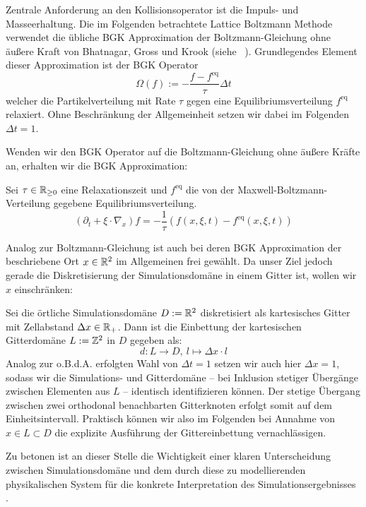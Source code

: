 Zentrale Anforderung an den Kollisionsoperator ist die Impuls- und Masseerhaltung. Die im Folgenden betrachtete Lattice Boltzmann Methode verwendet die übliche BGK Approximation der Boltzmann-Gleichung ohne äußere Kraft von Bhatnagar, Gross und Krook (siehe ~\cite[Kap.~3.5.3]{Krueger17}).
Grundlegendes Element dieser Approximation ist der BGK Operator
\[\Omega(f) := -\frac{f-f^\text{eq}}{\tau} \Delta t\]
welcher die Partikelverteilung mit Rate \(\tau\) gegen eine Equilibriumsverteilung \(f^\text{eq}\) relaxiert. Ohne Beschränkung der Allgemeinheit setzen wir dabei  im Folgenden \(\Delta t = 1\).

Wenden wir den BGK Operator auf die Boltzmann-Gleichung ohne äußere Kräfte an, erhalten wir die BGK Approximation:

\begin{Definition}
Sei \(\tau \in \mathbb{R}_{\geq 0}\) eine Relaxationszeit und \(f^\text{eq}\) die von der Maxwell-Boltzmann-Verteilung gegebene Equilibriumsverteilung.
\[ (\partial_t + \xi \cdot \nabla_x) f = -\frac{1}{\tau} (f(x,\xi,t) - f^\text{eq}(x,\xi,t)) \]
\end{Definition}

Analog zur Boltzmann-Gleichung ist auch bei deren BGK Approximation der beschriebene Ort \(x \in \mathbb{R}^2\) im Allgemeinen frei gewählt. Da unser Ziel jedoch gerade die Diskretisierung der Simulationsdomäne in einem Gitter ist, wollen wir \(x\) einschränken:

\begin{Definition}[Ortsdiskretisierung]
\label{def:SpatialDiscretizationLBM}
Sei die örtliche Simulationsdomäne \(D := \mathbb{R}^2\) diskretisiert als kartesisches Gitter mit Zellabstand \(\Delta x \in \mathbb{R}_+\). Dann ist die Einbettung der kartesischen Gitterdomäne \(L := \mathbb{Z}^2\) in \(D\) gegeben als:
\[d : L \to D, \ l \mapsto \Delta x \cdot l\]
Analog zur o.B.d.A. erfolgten Wahl von \(\Delta t = 1\) setzen wir auch hier \(\Delta x = 1\), sodass wir die Simulations- und Gitterdomäne -- bei Inklusion stetiger Übergänge zwischen Elementen aus \(L\) -- identisch identifizieren können. Der stetige Übergang zwischen zwei orthodonal benachbarten Gitterknoten erfolgt somit auf dem Einheitsintervall. Praktisch können wir also im Folgenden bei Annahme von \(x \in L \subset D\) die explizite Ausführung der Gittereinbettung vernachlässigen.
\end{Definition}

Zu betonen ist an dieser Stelle die Wichtigkeit einer klaren Unterscheidung zwischen Simulationsdomäne und dem durch diese zu modellierenden physikalischen System für die konkrete Interpretation des Simulationsergebnisses \cite[Kap.~7]{Krueger17}.

